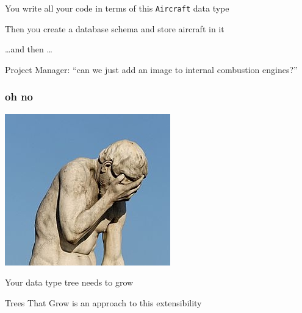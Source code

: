 \begin{frame}
\begin{center}
You write all your code in terms of this \lstinline{Aircraft} data type
\end{center}
\end{frame}

\begin{frame}
\begin{center}
Then you create a database schema and store aircraft in it
\end{center}
\end{frame}

\begin{frame}
\begin{center}
\ldots and then \ldots
\end{center}
\end{frame}

\begin{frame}
\begin{center}
Project Manager: ``can we just add an image to internal combustion engines?''
\end{center}
\end{frame}

\begin{frame}[fragile]
\frametitle{oh no}
\begin{center}
\includegraphics[height=0.24\textheight]{image/ohno.jpg}
\end{center}
\end{frame}

\begin{frame}
\begin{center}
Your data type tree needs to grow
\end{center}
\end{frame}

\begin{frame}
\begin{center}
Trees That Grow is an approach to this extensibility
\end{center}
\end{frame}
